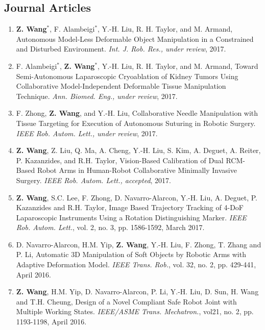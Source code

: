 \documentclass[10pt,letterpaper]{article}
\begin{document}
\subsection*{Journal Articles}
\begin{enumerate}
    \item \textbf{Z. Wang}$^*$, F. Alambeigi$^*$, Y.-H. Liu, R. H. Taylor, and M. Armand,
    Autonomous Model-Less Deformable Object Manipulation in a Constrained and Disturbed Environment.
    \textit{Int. J. Rob. Res., under review}, 2017.
    \item F. Alambeigi$^*$, \textbf{Z. Wang}$^*$, Y.-H. Liu, R. H. Taylor, and M. Armand,
    Toward Semi-Autonomous Laparoscopic Cryoablation of Kidney Tumors Using Collaborative Model-Independent Deformable Tissue Manipulation Technique.
    \textit{Ann. Biomed. Eng., under review}, 2017.
	\item F. Zhong, \textbf{Z. Wang}, and Y.-H. Liu,
	Collaborative Needle Manipulation with Tissue Targeting for Execution of Autonomous Suturing in Robotic Surgery.
	\textit{IEEE Rob. Autom. Lett., under review}, 2017.
    \item \textbf{Z. Wang}, Z. Liu, Q. Ma, A. Cheng, Y.-H. Liu, S. Kim, A. Deguet, A. Reiter, P. Kazanzides, and R.H. Taylor,
    Vision-Based Calibration of Dual RCM-Based Robot Arms in Human-Robot Collaborative Minimally Invasive Surgery.
    \textit{IEEE Rob. Autom. Lett., accepted}, 2017.
    \item \textbf{Z. Wang}, S.C. Lee, F. Zhong, D. Navarro-Alarcon, Y.-H. Liu, A. Deguet, P. Kazanzides and R.H. Taylor,
    Image Based Trajectory Tracking of 4-DoF Laparoscopic Instruments Using a Rotation Distinguishing Marker.
    \textit{IEEE Rob. Autom. Lett.}, vol. 2, no. 3, pp. 1586-1592, March 2017.
    \item D. Navarro-Alarcon, H.M. Yip, \textbf{Z. Wang}, Y.-H. Liu, F. Zhong, T. Zhang and P. Li,
    Automatic 3D Manipulation of Soft Objects by Robotic Arms with Adaptive Deformation Model.
    \textit{{IEEE} Trans. Rob.}, vol. 32, no. 2, pp. 429-441, April 2016.
    \item \textbf{Z. Wang}, H.M. Yip, D. Navarro-Alarcon, P. Li, Y.-H. Liu, D. Sun, H. Wang and T.H. Cheung,
    Design of a Novel Compliant Safe Robot Joint with Multiple Working States.
    \textit{{IEEE/ASME} Trans. Mechatron.}, vol21, no. 2, pp. 1193-1198, April 2016.
\end{enumerate}
\end{document}
